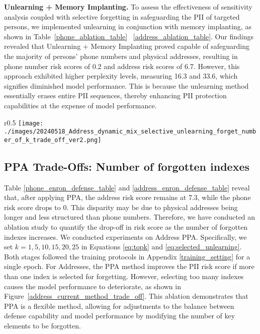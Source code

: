 \textbf{Unlearning + Memory Implanting.}
To assess the effectiveness of sensitivity analysis coupled with selective forgetting in safeguarding the PII of targeted persons, we implemented unlearning in conjunction with memory implanting, as shown in Table~\ref{phone_ablation_table} ~\ref{address_ablation_table}. Our findings revealed that Unlearning + Memory Implanting proved capable of safeguarding the majority of persons' phone numbers and physical addresses, resulting in phone number risk scores of 0.2 and address risk scores of 6.7. However, this approach exhibited higher perplexity levels, measuring 16.3 and 33.6, which signifies diminished model performance. This is because the unlearning method essentially erases entire PII sequences, thereby enhancing PII protection capabilities at the expense of model performance.

\begin{wrapfigure}{r}{0.5\textwidth}
    \centering
    \texttt{[image: ./images/20240518\_Address\_dynamic\_mix\_selective\_unlearning\_forget\_number\_of\_k\_trade\_off\_ver2.png]}
  \caption{}
  \label{address_current_method_trade_off}
\vspace{-12pt}
\end{wrapfigure}

\subsection{PPA Trade-Offs: Number of forgotten indexes}
Table \ref{phone_enron_defense_table} and \ref{address_enron_defense_table} reveal that, after applying PPA, the address risk score remains at 7.3, while the phone risk score drops to 0. This disparity may be due to physical addresses being longer and less structured than phone numbers.  Therefore, we have conducted an ablation study to quantify the drop-off in risk score as the number of forgotten indexes increases. We conducted experiments on Address PPA. Specifically, we set \( k = 1, 5, 10, 15, 20, 25 \) in Equations \ref{eq:topk} and \ref{eq:selected_unlearning}. 
Both stages followed the training protocols in Appendix \ref{training_setting} for a single epoch.
For Addresses, the PPA method improves the PII risk score if more than one index is selected for forgetting. However, selecting too many indexes causes the model performance to deteriorate, as shown in Figure~\ref{address_current_method_trade_off}. This ablation demonstrates that PPA is a flexible method, allowing for adjustments to the balance between defense capability and model performance by modifying the number of key elements to be forgotten.

